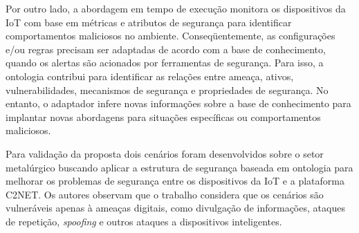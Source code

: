 \documentclass[tid,table]{texufpel} %
\begin{document}
Por outro lado, a abordagem em tempo de execução monitora os dispositivos da IoT com base em métricas e atributos de segurança para identificar comportamentos maliciosos no ambiente. Conseqüentemente, as configurações e/ou regras precisam ser adaptadas de acordo com a base de conhecimento, quando os alertas são acionados por ferramentas de segurança. Para isso, a ontologia contribui para identificar as relações entre ameaça, ativos, vulnerabilidades, mecanismos de segurança e propriedades de segurança. No entanto, o adaptador infere novas informações sobre a base de conhecimento para implantar novas abordagens para situações específicas ou comportamentos maliciosos.


Para validação da proposta dois cenários foram desenvolvidos sobre o setor metalúrgico buscando aplicar a estrutura de segurança baseada em ontologia para melhorar os problemas de segurança entre os dispositivos da IoT e a plataforma C2NET. Os autores observam que o trabalho considera que os cenários são vulneráveis apenas à ameaças digitais, como divulgação de informações, ataques de repetição, \textit{spoofing} e outros ataques a dispositivos inteligentes.
\end{document}
